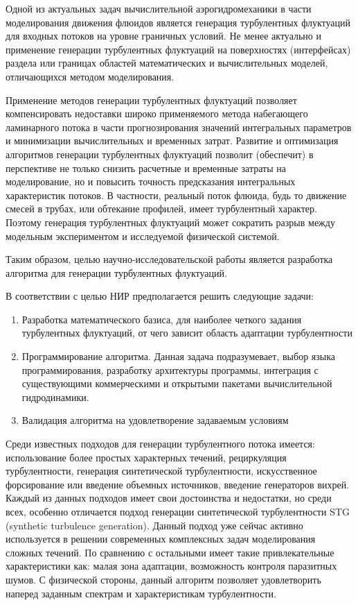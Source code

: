 {\actuality} Одной из актуальных задач вычислительной аэрогидромеханики в части моделирования движения флюидов является генерация турбулентных флуктуаций для входных потоков на уровне граничных условий. Не менее актуально и применение генерации турбулентных флуктуаций на поверхностях (интерфейсах) раздела или границах областей математических и вычислительных моделей, отличающихся методом моделирования.  

Применение методов генерации турбулентных флуктуаций позволяет компенсировать недоставки широко применяемого метода набегающего ламинарного потока в части прогнозирования значений интегральных параметров и минимизации вычислительных и временных затрат. Развитие и оптимизация алгоритмов генерации турбулентных флуктуаций позволит (обеспечит) в перспективе не только снизить расчетные и временные затраты на моделирование, но и повысить точность предсказания интегральных характеристик   потоков. В частности, реальный поток флюида, будь то движение смесей в трубах, или обтекание профилей, имеет турбулентный характер. Поэтому генерация турбулентных флуктуаций может сократить разрыв между модельным экспериментом и исследуемой физической системой. 

Таким образом, целью научно-исследовательской работы является разработка алгоритма для генерации турбулентных флуктуаций. 

В соответствии с целью НИР предполагается решить следующие задачи: 

\begin{enumerate}
    \item Разработка математического базиса, для наиболее четкого задания турбулентных флуктуаций, от чего зависит область адаптации турбулентности 
    \item Программирование алгоритма. Данная задача подразумевает, выбор языка программирования, разработку архитектуры программы, интеграция с существующими коммерческими и открытыми пакетами вычислительной гидродинамики.
    \item Валидация алгоритма на удовлетворение задаваемым условиям 
\end{enumerate}

Среди известных подходов для генерации турбулентного потока имеется: использование более простых характерных течений, рециркуляция турбулентности, генерация синтетической турбулентности, искусственное форсирование или введение объемных источников, введение генераторов вихрей. Каждый из данных подходов имеет свои достоинства и недостатки, но среди всех, особенно отличается подход генерации синтетической турбулентности STG (synthetic turbulence generation). Данный подход уже сейчас активно используется в решении современных комплексных задач моделирования сложных течений. По сравнению с остальными имеет такие привлекательные характеристики как: малая зона адаптации, возможность контроля паразитных шумов. С физической стороны, данный алгоритм позволяет удовлетворить наперед заданным спектрам и характеристикам турбулентности.  

